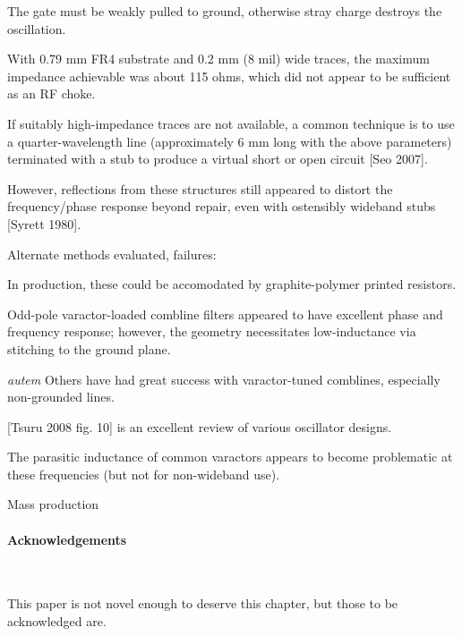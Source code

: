 \documentclass[fleqn,10pt]{article}
\begin{document}
\begin{multicols}{1}
The gate must be weakly pulled to ground, otherwise stray charge destroys the oscillation.




With 0.79 mm FR4 substrate and 0.2 mm (8 mil) wide traces, the maximum impedance achievable was about 115 ohms, which did not appear to be sufficient as an RF choke.

If suitably high-impedance traces are not available, a common technique is to use a quarter-wavelength line (approximately 6 mm long with the above parameters) terminated with a stub to produce a virtual short or open circuit [Seo 2007]. 

However, reflections from these structures still appeared to distort the frequency/phase response beyond repair, even with ostensibly wideband stubs [Syrett 1980].

\noindent{}

Alternate methods evaluated, failures: 


In production, these could be accomodated by graphite-polymer printed resistors. 


Odd-pole varactor-loaded combline filters appeared to have excellent phase and frequency response; however, the geometry necessitates low-inductance via stitching to the ground plane.

\begin{autem}
	{\it autem} Others have had great success with varactor-tuned comblines, especially non-grounded lines.
\end{autem}

[Tsuru 2008 fig. 10] is an excellent review of various oscillator designs.

The parasitic inductance of common varactors appears to become problematic at these frequencies (but not for non-wideband use).


\clearpage

{\Large Mass production}


\clearpage

\paragraph{Acknowledgements}\

This paper is not novel enough to deserve this chapter, but those to be acknowledged are.


\end{multicols}
\end{document}
